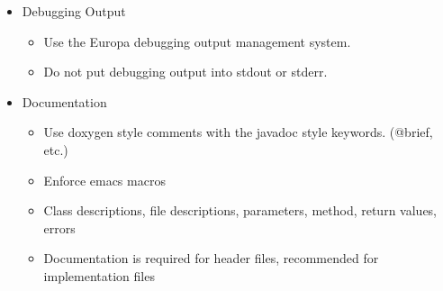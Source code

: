 \documentclass[10pt, letterpaper, twoside]{article}
\begin{document}
\begin{itemize}
\item[] Debugging Output
 \begin{itemize}
  \item	Use the Europa debugging output management system.
  \item	Do not put debugging output into stdout or stderr.
 \end{itemize}

\item[] Documentation
 \begin{itemize}
  \item	Use doxygen style comments with the javadoc style keywords. (@brief, etc.)
  \item	Enforce emacs macros
  \item	Class descriptions, file descriptions, parameters, method, return values, errors  
  \item	Documentation is required for header files, recommended for implementation files
 \end{itemize}
\end{itemize}
\end{document}
